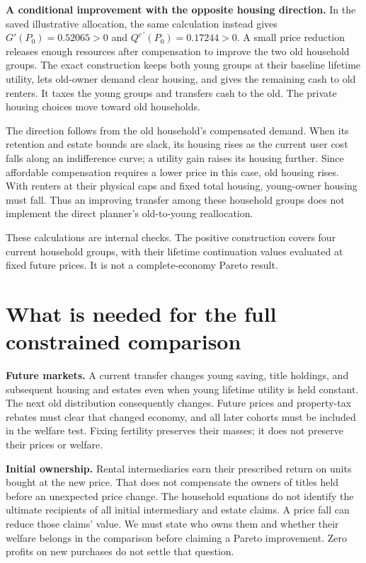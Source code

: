 \documentclass[11pt]{article}
\begin{document}
\textbf{A conditional improvement with the opposite housing direction.} In the
saved illustrative allocation, the same calculation instead gives
$G'(P_0)=0.52065>0$ and $Q^{c\,\prime}(P_0)=0.17244>0$. A small price reduction
releases enough resources after compensation to improve the two old household
groups. The exact construction keeps both young groups at their baseline
lifetime utility, lets old-owner demand clear housing, and gives the remaining
cash to old renters. It taxes the young groups and transfers cash to the old.
The private housing choices move toward old households.

The direction follows from the old household's compensated demand. When its
retention and estate bounds are slack, its housing rises as the current user
cost falls along an indifference curve; a utility gain raises its housing
further. Since affordable compensation requires a lower price in this case,
old housing rises. With renters at their physical caps and fixed total housing,
young-owner housing must fall. Thus an improving transfer among these household
groups does not implement the direct planner's old-to-young reallocation.

These calculations are internal checks. The positive construction covers four
current household groups, with their lifetime continuation values evaluated
at fixed future prices. It is not a complete-economy Pareto result.

\section{What is needed for the full constrained comparison}

\textbf{Future markets.} A current transfer changes young saving, title holdings,
and subsequent housing and estates even when young lifetime utility is held
constant. The next old distribution consequently changes. Future prices and
property-tax rebates must clear that changed economy, and all later cohorts
must be included in the welfare test. Fixing fertility preserves their masses;
it does not preserve their prices or welfare.

\textbf{Initial ownership.} Rental intermediaries earn their prescribed return
on units bought at the new price. That does not compensate the owners of titles
held before an unexpected price change. The household equations do not identify
the ultimate recipients of all initial intermediary and estate claims. A price
fall can reduce those claims' value. We must state who owns them and whether
their welfare belongs in the comparison before claiming a Pareto improvement.
Zero profits on new purchases do not settle that question.
\end{document}
